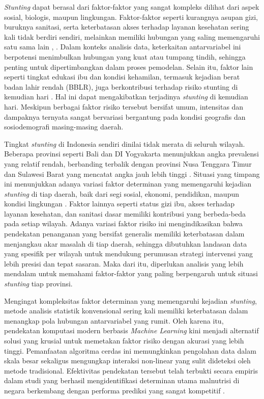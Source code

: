 \textit{Stunting} dapat berasal dari faktor-faktor yang sangat kompleks dilihat dari aspek sosial, biologis, maupun lingkungan. Faktor-faktor seperti kurangnya asupan gizi, buruknya sanitasi, serta keterbatasan akses terhadap layanan kesehatan sering kali tidak berdiri sendiri, melainkan memiliki hubungan yang saling memengaruhi satu sama lain \cite{supriyanto2023implementasi}, \cite{saleh2023edukasi}. Dalam konteks analisis data, keterkaitan antarvariabel ini berpotensi menimbulkan hubungan yang kuat atau tumpang tindih, sehingga penting untuk dipertimbangkan dalam proses pemodelan. Selain itu, faktor lain seperti tingkat edukasi ibu dan kondisi kehamilan, termasuk kejadian berat badan lahir rendah (BBLR), juga berkontribusi terhadap risiko stunting di kemudian hari \cite{saleh2023edukasi}. Hal ini dapat mengakibatkan terjadinya \textit{stunting} di kemudian hari. Meskipun berbagai faktor risiko tersebut bersifat umum, intensitas dan dampaknya ternyata sangat bervariasi bergantung pada kondisi geografis dan sosiodemografi masing-masing daerah.

Tingkat \textit{stunting} di Indonesia sendiri dinilai tidak merata di seluruh wilayah. Beberapa provinsi seperti Bali dan DI Yogyakarta menunjukkan angka prevalensi yang relatif rendah, berbanding terbalik dengan provinsi Nusa Tenggara Timur dan Sulawesi Barat yang mencatat angka jauh lebih tinggi \cite{kemenkes2025ssgi}. Situasi yang timpang ini menunjukkan adanya variasi faktor determinan yang memengaruhi kejadian \textit{stunting} di tiap daerah, baik dari segi sosial, ekonomi, pendidikan, maupun kondisi lingkungan \cite{zemariam2025prediction}. Faktor lainnya seperti status gizi ibu, akses terhadap layanan kesehatan, dan sanitasi dasar memiliki kontribusi yang berbeda-beda pada setiap wilayah. Adanya variasi faktor risiko ini mengindikasikan bahwa pendekatan penanganan yang bersifat generalis memiliki keterbatasan dalam menjangkau akar masalah di tiap daerah, sehingga dibutuhkan landasan data yang spesifik per wilayah untuk mendukung perumusan strategi intervensi yang lebih presisi dan tepat sasaran.  Maka dari itu, diperlukan analisis yang lebih mendalam untuk memahami faktor-faktor yang paling berpengaruh untuk situasi \textit{stunting} tiap provinsi.

Mengingat kompleksitas faktor determinan yang memengaruhi kejadian \textit{stunting}, metode analisis statistik konvensional sering kali memiliki keterbatasan dalam menangkap pola hubungan antarvariabel yang rumit. Oleh karena itu, pendekatan komputasi modern berbasis \textit{Machine Learning} kini menjadi alternatif solusi yang krusial untuk memetakan faktor risiko dengan akurasi yang lebih tinggi. Pemanfaatan algoritma cerdas ini memungkinkan pengolahan data dalam skala besar sekaligus mengungkap interaksi non-linear yang sulit dideteksi oleh metode tradisional. Efektivitas pendekatan tersebut telah terbukti secara empiris dalam studi yang berhasil mengidentifikasi determinan utama malnutrisi di negara berkembang dengan performa prediksi yang sangat kompetitif \cite{tamanna2025identifying}.

